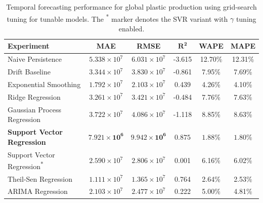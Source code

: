 \begin{table}[!ht]
	\centering
	\caption{
		\centering Temporal forecasting performance for global plastic production using grid-search tuning for tunable models. The \textsuperscript{*} marker denotes the SVR variant with \(\gamma\) tuning enabled.
	}
	\begin{tabular}{@{}lccccc@{}}
		\toprule
		\textbf{Experiment}                          & \textbf{MAE}                   & \textbf{RMSE}                  & $\mathbf{R^2}$     & \textbf{WAPE}       & \textbf{MAPE}       \\
		\midrule
		Naive Persistence                            & \(5.338 \times 10^7\)          & \(6.031 \times 10^7\)          & -3.615             & 12.70\%             & 12.31\%             \\
		Drift Baseline                               & \(3.344 \times 10^7\)          & \(3.830 \times 10^7\)          & -0.861             & 7.95\%              & 7.69\%              \\
		Exponential Smoothing                        & \(1.792 \times 10^7\)          & \(2.103 \times 10^7\)          & 0.439              & 4.26\%              & 4.10\%              \\
		Ridge Regression                             & \(3.261 \times 10^7\)          & \(3.421 \times 10^7\)          & -0.484             & 7.76\%              & 7.63\%              \\
		Gaussian Process Regression                  & \(3.722 \times 10^7\)          & \(4.086 \times 10^7\)          & -1.118             & 8.85\%              & 8.63\%              \\
		\textbf{Support Vector Regression}           & \(\mathbf{7.921 \times 10^6}\) & \(\mathbf{9.942 \times 10^6}\) & \(\mathbf{0.875}\) & \(\mathbf{1.88}\)\% & \(\mathbf{1.80}\)\% \\
		Support Vector Regression\textsuperscript{*} & \(2.590 \times 10^7\)          & \(2.806 \times 10^7\)          & 0.001              & 6.16\%              & 6.02\%              \\
		Theil-Sen Regression                         & \(1.111 \times 10^7\)          & \(1.365 \times 10^7\)          & 0.764              & 2.64\%              & 2.53\%              \\
		ARIMA Regression                             & \(2.103 \times 10^7\)          & \(2.477 \times 10^7\)          & 0.222              & 5.00\%              & 4.81\%              \\
		\hline
	\end{tabular}
	\label{tab:global_forecasting_grid_search_metrics}
\end{table}
